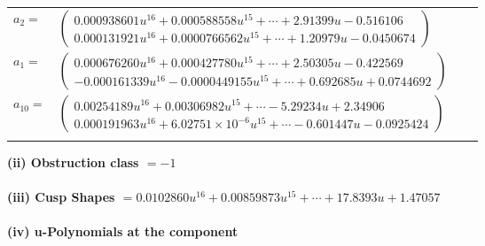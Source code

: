 \documentclass[1p]{elsarticle_modified}
\theoremstyle{definition}
\begin{document}
\begin{tabular}{m{7pt} m{180pt} m{7pt} m{180pt} }
\flushright $a_{2}=$&$\begin{pmatrix}0.000938601 u^{16}+0.000588558 u^{15}+\cdots+2.91399 u-0.516106\\0.000131921 u^{16}+0.0000766562 u^{15}+\cdots+1.20979 u-0.0450674\end{pmatrix}$ \\
\flushright $a_{1}=$&$\begin{pmatrix}0.000676260 u^{16}+0.000427780 u^{15}+\cdots+2.50305 u-0.422569\\-0.000161339 u^{16}-0.0000449155 u^{15}+\cdots+0.692685 u+0.0744692\end{pmatrix}$ \\
\flushright $a_{10}=$&$\begin{pmatrix}0.00254189 u^{16}+0.00306982 u^{15}+\cdots-5.29234 u+2.34906\\0.000191963 u^{16}+6.02751\times10^{-6} u^{15}+\cdots-0.601447 u-0.0925424\end{pmatrix}$\\&\end{tabular}
\flushleft \textbf{(ii) Obstruction class $= -1$}\\~\\
\flushleft \textbf{(iii) Cusp Shapes $= 0.0102860 u^{16}+0.00859873 u^{15}+\cdots+17.8393 u+1.47057$}\\~\\
\newpage\renewcommand{\arraystretch}{1}
\flushleft \textbf{(iv) u-Polynomials at the component}\newline \\
\end{document}
